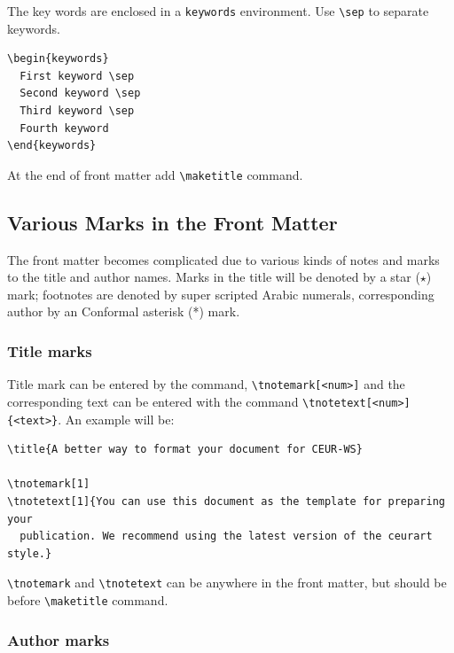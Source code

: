 \documentclass[
]{ceurart}
\begin{document}
The key words are enclosed in a \verb|keywords|
environment. Use \verb|\sep| to separate keywords.

\begin{lstlisting}
\begin{keywords}
  First keyword \sep 
  Second keyword \sep 
  Third keyword \sep 
  Fourth keyword
\end{keywords}
\end{lstlisting}

At the end of front matter add \verb|\maketitle| command.

\subsection{Various Marks in the Front Matter}

The front matter becomes complicated due to various kinds
of notes and marks to the title and author names. Marks in
the title will be denoted by a star ($\star$) mark;
footnotes are denoted by super scripted Arabic numerals,
corresponding author by an Conformal asterisk (*) mark.

\subsubsection{Title marks}

Title mark can be entered by the command, \verb|\tnotemark[<num>]|
and the corresponding text can be entered with the command
\verb|\tnotetext[<num>]{<text>}|. An example will be:

\begin{lstlisting}
\title{A better way to format your document for CEUR-WS}

\tnotemark[1]
\tnotetext[1]{You can use this document as the template for preparing your
  publication. We recommend using the latest version of the ceurart style.}
\end{lstlisting}

\verb|\tnotemark| and \verb|\tnotetext| can be anywhere in
the front matter, but should be before \verb|\maketitle| command.

\subsubsection{Author marks}
\end{document}
